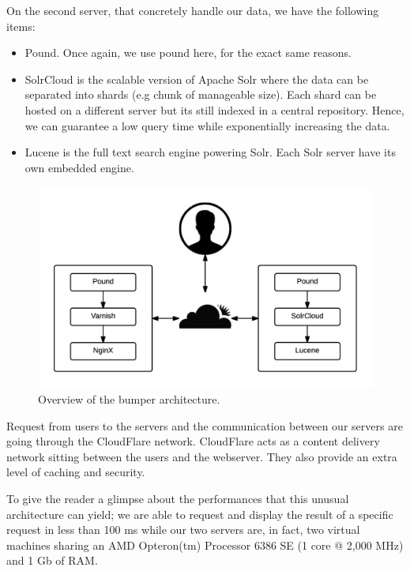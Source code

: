On the second server, that concretely handle our data, we have the following items:

\begin{itemize}
	\item Pound. Once again, we use pound here, for the exact same reasons.
	\item SolrCloud is the scalable version of Apache Solr where the data can be separated into shards (e.g chunk of manageable size). Each shard can be hosted on a different server but its still indexed in a central repository. Hence, we can guarantee a low query time while exponentially increasing the data.
	\item Lucene is the full text search engine powering Solr. Each Solr server have its own embedded engine.
\end{itemize}

\begin{figure}[h!]
  \centering
    \includegraphics{media/bumper-arch.png}
    \caption{Overview of the bumper architecture.
    \label{fig:bumper-arch}}
\end{figure}

Request from users to the servers and the communication between our servers are going through the CloudFlare network.
CloudFlare acts as a content delivery network sitting between the users and the webserver.
They also provide an extra level of caching and security.

To give the reader a glimpse about the performances that this unusual architecture can yield; we are able to request and display the result of a specific request in less than 100 ms while our two servers are, in fact, two virtual machines sharing an AMD Opteron(tm) Processor 6386 SE (1 core @ 2,000 MHz) and 1 Gb of RAM.

